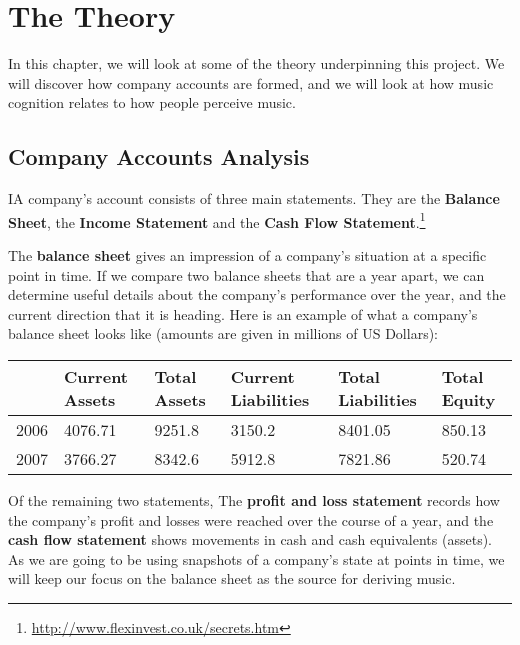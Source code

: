 \chapter{The Theory}

In this chapter, we will look at some of the theory underpinning this project. We will discover how company accounts are formed, and we will look at how music cognition relates to how people perceive music.

\section{Company Accounts Analysis}

IA company's account consists of three main statements. They are the \textbf{Balance Sheet}, the \textbf{Income Statement} and the \textbf{Cash Flow Statement}.\footnote{\url{http://www.flexinvest.co.uk/secrets.htm}}

The \textbf{balance sheet} gives an impression of a company's situation at a specific point in time. If we compare two balance sheets that are a year apart, we can determine useful details about the company's performance over the year, and the current direction that it is heading. Here is an example of what a company's balance sheet looks like (amounts are given in millions of US Dollars):

\small
\begin{center}
\begin{singlespace}
\begin{tabular}{ | l || l | l | l | l | l | }
\hline
 & \textbf{Current Assets} & \textbf{Total Assets} & \textbf{Current Liabilities} & \textbf{Total Liabilities} & \textbf{Total Equity} \\ \hline \hline
2006 & 4076.71 & 9251.8 & 3150.2 & 8401.05 & 850.13 \\ \hline
2007 & 3766.27 & 8342.6 & 5912.8 & 7821.86 & 520.74 \\
\hline
\end{tabular}
\end{singlespace}
\end{center}
\normalsize

Of the remaining two statements, The \textbf{profit and loss statement} records how the company's profit and losses were reached over the course of a year, and the \textbf{cash flow statement} shows movements in cash and cash equivalents (assets). As we are going to be using snapshots of a company's state at points in time, we will keep our focus on the balance sheet as the source for deriving music.

